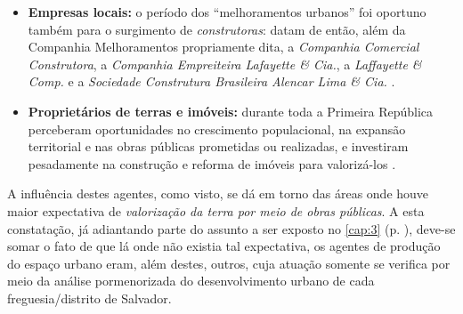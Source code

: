 \begin{itemize}
\item {}\textbf{Empresas locais:} o período dos ``melhoramentos urbanos'' foi oportuno também para o surgimento de \textit{construtoras}: datam de então, além da Companhia Melhoramentos propriamente dita, a \textit{Companhia Comercial Construtora}, a \textit{Companhia Empreiteira Lafayette \& Cia.}, a \textit{Laffayette \& Comp.} e a \textit{Sociedade Construtura Brasileira Alencar Lima \& Cia.} \cite{flexor_higi_2011}.
\item {}\textbf{Proprietários de terras e imóveis:} durante toda a Primeira República perceberam oportunidades no crescimento populacional, na expansão territorial e nas obras públicas prometidas ou realizadas, e investiram pesadamente na construção e reforma de imóveis para valorizá-los \cite{almeida_victoria_1997,almeida_vitrinescomercio_2014}.
\end{itemize}

A influência destes agentes, como visto, se dá em torno das áreas onde houve maior expectativa de \textit{valorização da terra por meio de obras públicas}. A esta constatação, já adiantando parte do assunto a ser exposto no \autoref{cap:3} (p. \pageref{cap:3}), deve-se somar o fato de que lá onde não existia tal expectativa, os agentes de produção do espaço urbano eram, além destes, outros, cuja atuação somente se verifica por meio da análise pormenorizada do desenvolvimento urbano de cada freguesia/distrito de Salvador.